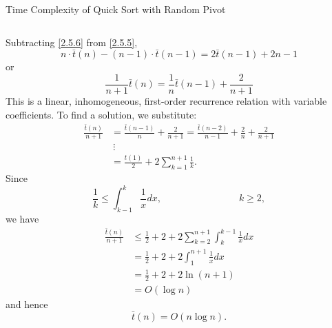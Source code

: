 \documentclass[smaller,hyperref={CJKbookmarks=true}]{beamer}
\begin{document}
\begin{frame}{Time Complexity of Quick Sort with Random Pivot}
\begin{spacing}{0.8}
\begin{equation}
\end{equation}
\end{spacing}
\newpage
\begin{spacing}{1}
Subtracting \eqref{2.5.6} from \eqref{2.5.5},
\[n\cdot\bar{t}(n)-(n-1)\cdot\bar{t}(n-1)=2\bar{t}(n-1)+2n-1\]
or
\[\frac{1}{n+1}\bar{t}(n)=\frac{1}{n}\bar{t}(n-1)
+\frac{2}{n+1}\]
This is a linear, inhomogeneous, first-order recurrence relation with
variable coefficients. To find a solution, we substitute:
\begin{equation*}
  \begin{split}
     \frac{\bar{t}(n)}{n+1} &=\frac{\bar{t}(n-1)}{n}+\frac{2}{n+1}
     =\frac{\bar{t}(n-2)}{n-1}+\frac{2}{n}+
     \frac{2}{n+1} \\
       &~\vdots \\
       &=\frac{t(1)}{2}+2\sum_{k=1}^{n+1}\frac{1}{k}.
  \end{split}
\end{equation*}
\newpage
Since
\[\frac{1}{k}\leq\int_{k-1}^{k}\frac{1}{x}dx,\qquad\qquad\qquad\qquad
k\geq2,\]
we have
\begin{equation*}
  \begin{split}
     \frac{\bar{t}(n)}{n+1} &\leq\frac{1}{2}+2+2\sum_{k=2}^{n+1}\int_{k}^{k-1}\frac{1}{x}dx \\
       &=\frac{1}{2}+2+2\int_{1}^{n+1}\frac{1}{x}dx \\
       &=\frac{1}{2}+2+2\ln(n+1) \\
       &=O(\log n)
  \end{split}
\end{equation*}
and hence
\[\bar{t}(n)=O(n\log n).\]
\end{spacing}
\end{frame}
\end{document}
